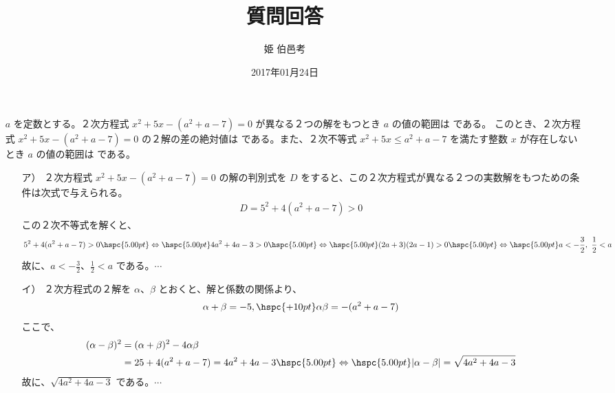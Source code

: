 \documentclass[10pt,a4paper,disablejfam,dvipdfmx,fleqn,onecolumn,oneside,openany,report]{jsarticle}
\title{質問回答} \author{姫 伯邑考} \date{2017年01月24日}
\begin{document}
\maketitle
\begin{itemize}
\item[\ajMaru{15}] $a$ を定数とする。２次方程式 $x^{2}+5x-(a^{2}+a-7) = 0$ が異なる２つの解をもつとき $a$ の値の範囲は  である。
  このとき、２次方程式 $x^{2}+5x-(a^{2}+a-7) = 0$ の２解の差の絶対値は  である。また、２次不等式 $x^{2}+5x \le a^{2}+a-7$ を満たす整数 $x$ が存在しないとき $a$ の値の範囲は  である。
  \begin{solve}
    \begin{itemize}
    \item[ア）] ２次方程式 $x^{2}+5x-(a^{2}+a-7)=0$ の解の判別式を $D$ をすると、この２次方程式が異なる２つの実数解をもつための条件は次式で与えられる。
      \begin{align*}
        D = 5^{2}+4(a^{2}+a-7) > 0
      \end{align*}
      この２次不等式を解くと、
      \begin{align*}
        5^{2}+4(a^{2}+a-7) > 0 \hspc{5.00pt} \Leftrightarrow \hspc{5.00pt} 4a^{2}+4a-3 > 0 \hspc{5.00pt} \Leftrightarrow \hspc{5.00pt} (2a+3)(2a-1) > 0 \hspc{5.00pt} \Leftrightarrow \hspc{5.00pt} a <-\frac{3}{2},\ \frac{1}{2} < a
      \end{align*}
      故に、$a<-\frac{3}{2}$、$\frac{1}{2}<a$ である。$\cdots$ 

    \item[イ）] ２次方程式の２解を $\alpha$、$\beta$ とおくと、解と係数の関係より、
      \begin{align*}
        \alpha + \beta =-5,\hspc{+10pt} \alpha\beta =-(a^{2}+a-7)
      \end{align*}
      ここで、
      \begin{align*}
        (\alpha-\beta)^{2} & = (\alpha+\beta)^{2}-4\alpha\beta \\ & = 25+4(a^{2}+a-7) = 4a^{2}+4a-3 \hspc{5.00pt} \Leftrightarrow \hspc{5.00pt} |\alpha-\beta| = \sqrt{4a^{2}+4a-3}
      \end{align*}
      故に、$\sqrt{4a^{2}+4a-3}$ である。$\cdots$ 
    \end{itemize}


\end{solve}
\end{itemize}
\end{document}
